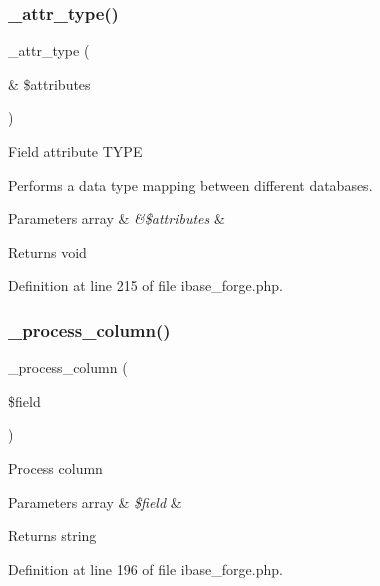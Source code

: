\subsubsection{\texorpdfstring{\_attr\_type()}{\_attr\_type()}}
{\footnotesize\ttfamily \+\_\+attr\+\_\+type (\begin{DoxyParamCaption}\item[{\&}]{\$attributes }\end{DoxyParamCaption})\hspace{0.3cm}{\ttfamily [protected]}}

Field attribute T\+Y\+PE

Performs a data type mapping between different databases.


\begin{DoxyParams}[1]{Parameters}
array & {\em \&\$attributes} & \\
\hline
\end{DoxyParams}
\begin{DoxyReturn}{Returns}
void 
\end{DoxyReturn}


Definition at line 215 of file ibase\+\_\+forge.\+php.

\mbox{\label{class_c_i___d_b__ibase__forge_a8f38f1c5b5dddecca4befbe393f3f299}} 
\subsubsection{\texorpdfstring{\_process\_column()}{\_process\_column()}}
{\footnotesize\ttfamily \+\_\+process\+\_\+column (\begin{DoxyParamCaption}\item[{}]{\$field }\end{DoxyParamCaption})\hspace{0.3cm}{\ttfamily [protected]}}

Process column


\begin{DoxyParams}[1]{Parameters}
array & {\em \$field} & \\
\hline
\end{DoxyParams}
\begin{DoxyReturn}{Returns}
string 
\end{DoxyReturn}


Definition at line 196 of file ibase\+\_\+forge.\+php.

